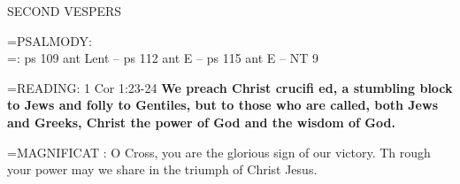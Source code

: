 \begin{flushleft}\normalsize SECOND VESPERS\\\end{flushleft}

\hangindent=\parindent \small{PSALMODY:}\\
\hangindent=\parindent : ps 109 ant Lent -- ps 112 ant E -- ps 115 ant E -- NT 9\vspace{0.5em}

\hangindent=\parindent \small{READING}: 1 Cor 1:23-24 \textbf{We preach Christ crucifi ed, a stumbling block
to Jews and folly to Gentiles, but to those who are called, both Jews
and Greeks, Christ the power of God and the wisdom of God.\\}
 
\hangindent=\parindent \small{MAGNIFICAT : O Cross, you are the glorious sign of our victory. Th rough
your power may we share in the triumph of Christ Jesus.\\}
 

